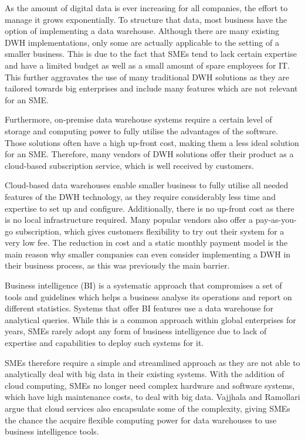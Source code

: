 \documentclass[../paper.tex]{subfiles}
\begin{document}
As the amount of digital data is ever increasing for all companies, the effort
to manage it grows exponentially. To structure that data, most business have
the option of implementing a data warehouse. Although there are many existing
DWH implementations, only some are actually applicable to the setting of a
smaller business. This is due to the fact that SMEs tend to lack certain
expertise and have a limited budget as well as a small amount of spare
employees for IT. This further aggravates the use of many traditional DWH
solutions as they are tailored towards big enterprises and include many
features which are not relevant for an SME.~\cite{Raj2016}

Furthermore, on-premise data warehouse systems require a certain level of
storage and computing power to fully utilise the advantages of the software.
Those solutions often have a high up-front cost, making them a less ideal
solution for an SME. Therefore, many vendors of DWH solutions offer their
product as a cloud-based subscription service, which is well received by
customers.~\cite{Agostino2013}

Cloud-based data warehouses enable smaller business to fully utilise all needed
features of the DWH technology, as they require considerably less time and
expertise to set up and configure. Additionally, there is no up-front cost as
there is no local infrastructure required. Many popular vendors also offer a
pay-as-you-go subscription, which gives customers flexibility to try out their
system for a very low fee. The reduction in cost and a static monthly payment
model is the main reason why smaller companies can even consider implementing
a DWH in their business process, as this was previously the main
barrier.~\cite{Fernandes2016}

Business intelligence (BI) is a systematic approach that compromises a set of
tools and guidelines which helps a business analyse its operations and report
on different statistics. Systems that offer BI features use a data warehouse
for analytical queries. While this is a common approach within global
enterprises for years, SMEs rarely adopt any form of business intelligence
due to lack of expertise and capabilities to deploy such systems for
it.~\cite{Golfarelli2004}

SMEs therefore require a simple and streamlined approach as they are not able
to analytically deal with big data in their existing systems. With the addition
of cloud computing, SMEs no longer need complex hardware and software systems,
which have high maintenance costs, to deal with big data. Vajjhala and
Ramollari argue that cloud services also encapsulate some of the complexity,
giving SMEs the chance the acquire flexible computing power for data warehouses
to use business intelligence tools.~\cite{Vajjhala2016}
\end{document}
